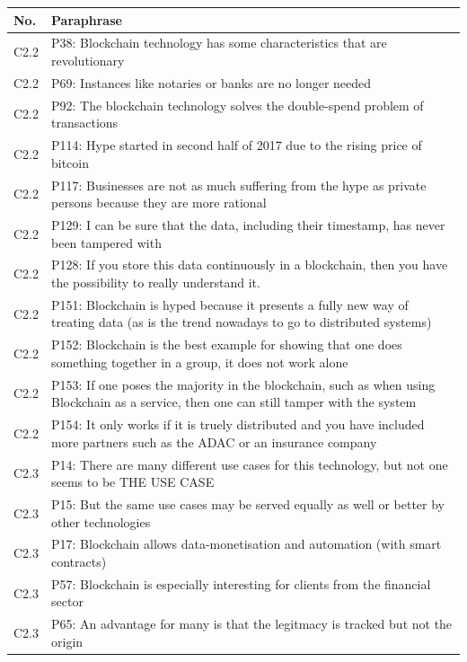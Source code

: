 \begin{table}[H]
    \centering
    \begin{tabularx}{\textwidth}{l|X}
    No. & Paraphrase \\\hline
	C2.2 & P38: Blockchain technology has some characteristics that are revolutionary \\  
	C2.2 & P69: Instances like notaries or banks are no longer needed \\  
	C2.2 & P92: The blockchain technology solves the double-spend problem of transactions \\  
	C2.2 & P114: Hype started in second half of 2017 due to the rising price of bitcoin \\  
	C2.2 & P117: Businesses are not as much suffering from the hype as private persons because they are more rational \\  
	C2.2 & P129: I can be sure that the data, including their timestamp, has never been tampered with \\  
	C2.2 & P128: If you store this data continuously in a blockchain, then you have the possibility to really understand it. \\  
	C2.2 & P151: Blockchain is hyped because it presents a fully new way of treating data (as is the trend nowadays to go to distributed systems) \\  
	C2.2 & P152: Blockchain is the best example for showing that one does something together in a group, it does not work alone \\  
	C2.2 & P153: If one poses the majority in the blockchain, such as when using Blockchain as a service, then one can still tamper with the system \\  
	C2.2 & P154: It only works if it is truely distributed and you have included more partners such as the ADAC or an insurance company \\  
	C2.3 & P14: There are many different use cases for this technology, but not one seems to be THE USE CASE \\  
	C2.3 & P15: But the same use cases may be served equally as well or better by other technologies \\  
	C2.3 & P17: Blockchain allows data-monetisation and automation (with smart contracts) \\  
	C2.3 & P57: Blockchain is especially interesting for clients from the financial sector \\  
	C2.3 & P65: An advantage for many is that the legitmacy is tracked but not the origin \\  

\end{tabularx}
\end{table}
